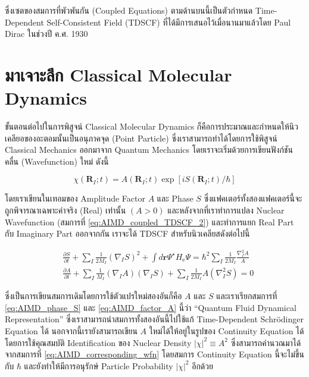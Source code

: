 \noindent ซึ่งเซตของสมการที่พัวพันกัน (Coupled Equations) ตามด้านบนนี้เป็นตัวกำหนด Time-Dependent Self-Consistent Field
(TDSCF) ที่ได้มีการเสนอไว้เมื่อนานมาแล้วโดย Paul Dirac ในช่วงปี ค.ศ. 1930

\section{มาเจาะลึก Classical Molecular Dynamics}

ขั้นตอนต่อไปในการพิสูจน์ Classical Molecular Dynamics ก็คือการประมาณและกำหนดให้นิวเคลียอของอะตอมนั้นเป็นอนุภาคจุด (Point
Particle) ซึ่งเราสามารถทำได้โดยการใช้พิสูจน์ Classical Mechanics ออกมาจาก Quantum Mechanics โดยเราจะเริ่มด้วยการเขียนฟังก์ชันคลื่น
(Wavefunction) ใหม่ ดังนี้

\begin{equation}
  \label{eq:AIMD_corresponding_wfn}
  \chi\left(\mathbf{R}_I ; t\right)
  =
  A\left(\mathbf{R}_I ; t\right) \exp \left[i S\left(\mathbf{R}_I ; t\right) / \hbar\right]
\end{equation}

\noindent โดยเราเขียนในเทอมของ Amplitude Factor $A$ และ Phase $S$ ซึ่งแฟคเตอร์ทั้งสองแฟคเตอร์นี้จะถูกพิจารณาเฉพาะค่าจริง (Real)
เท่านั้น $(A>0)$ และหลังจากที่เราทำการแปลง Nuclear Wavefunction (สมการที่ \eqref{eq:AIMD_coupled_TDSCF_2}) และทำการแยก
Real Part กับ Imaginary Part ออกจากกัน เราจะได้ TDSCF สำหรับนิวเคลียสดังต่อไปนี้

\begin{align}
  \label{eq:AIMD_phase_S}
   & \frac{\partial S}{\partial t}
  + \sum_I \frac{1}{2 M_I}\left(\nabla_I S\right)^2
  + \int d \mathbf{r} \Psi^{\star} H_{\mathrm{e}} \Psi
  =
  \hbar^2 \sum_I \frac{1}{2 M_I} \frac{\nabla_I^2 A}{A} \\
  \label{eq:AIMD_factor_A}
   & \frac{\partial A}{\partial t}
  + \sum_I \frac{1}{M_I}\left(\nabla_I A\right)\left(\nabla_I S\right)
  + \sum_I \frac{1}{2 M_I} A\left(\nabla_I^2 S\right)
  =
  0
\end{align}

\noindent ซึ่งเป็นการเขียนสมการเดิมโดยการใช้ตัวแปรใหม่สองอันก็คือ $A$ และ $S$ และเราเรียกสมการที่ \eqref{eq:AIMD_phase_S} และ
\eqref{eq:AIMD_factor_A} นี้ว่า \enquote{Quantum Fluid Dynamical Representation} ซึ่งเราสามารถนำสมการทั้งสองอันนี้ไปใช้แก้
Time-Dependent Schr\"{o}dinger Equation ได้ นอกจากนี้เรายังสามารถเขียน $A$ ใหม่ได้ให้อยู่ในรูปของ Continuity Equation
ได้โดยการใช้คุณสมบัติ Identification ของ Nuclear Density $|\chi|^2 \equiv A^2$ ซึ่งสามารถคำนวณมาได้จากสมการที่
\eqref{eq:AIMD_corresponding_wfn} โดยสมการ Continuity Equation นี้จะไม่ขึ้นกับ $\hbar$ และยังทำให้มีการอนุรักษ์ Particle
Probability $|\chi|^2$ อีกด้วย

